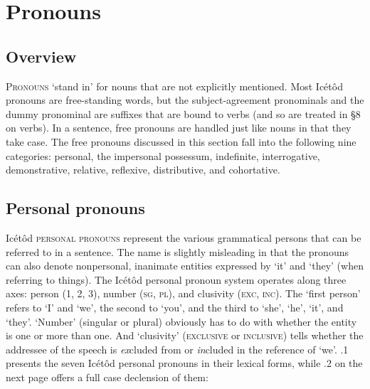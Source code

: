 \section{Pronouns}



\subsection{Overview}


\textsc{Pronouns} ‘stand in’ for nouns that are not explicitly mentioned. Most Icétôd pronouns are free-standing words, but the subject-agreement pronominals and the dummy pronominal are suffixes that are bound to verbs (and so are treated in §8 on verbs). In a sentence, free pronouns are handled just like nouns in that they take case. The free pronouns discussed in this section fall into the following nine categories: personal, the impersonal possessum, indefinite, interrogative, demonstrative, relative, reflexive, distributive, and cohortative.




\subsection{Personal pronouns}


Icétôd \textsc{personal pronouns }represent the various grammatical persons that can be referred to in a sentence. The name is slightly misleading in that the pronouns can also denote nonpersonal, inanimate entities expressed by ‘it’ and ‘they’ (when referring to things). The Icétôd personal pronoun system operates along three axes: person (1, 2, 3), number (\textsc{sg}, \textsc{pl}), and clusivity (\textsc{exc}, \textsc{inc}). The ‘first person’ refers to ‘I’ and ‘we’, the second to ‘you’, and the third to ‘she’, ‘he’, ‘it’, and ‘they’. ‘Number’ (singular or plural) obviously has to do with whether the entity is one or more than one. And ‘clusivity’ (\textsc{exclusive} or \textsc{inclusive}) tells whether the addressee of the speech is \textit{ex}cluded from or \textit{in}cluded in the reference of ‘we’. .1 presents the seven Icétôd personal pronouns in their lexical forms, while .2 on the next page offers a full case declension of them:


